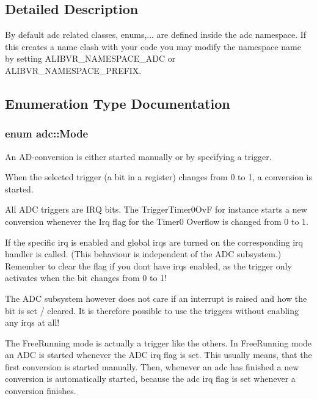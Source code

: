 \subsection{Detailed Description}
By default adc related classes, enums,... are defined inside the {\ttfamily adc} namespace. If this creates a name clash with your code you may modify the namespace name by setting A\+L\+I\+B\+V\+R\+\_\+\+N\+A\+M\+E\+S\+P\+A\+C\+E\+\_\+\+A\+DC or A\+L\+I\+B\+V\+R\+\_\+\+N\+A\+M\+E\+S\+P\+A\+C\+E\+\_\+\+P\+R\+E\+F\+IX. 

\subsection{Enumeration Type Documentation}
\subsubsection[{\texorpdfstring{Mode}{Mode}}]{\setlength{\rightskip}{0pt plus 5cm}enum {\bf adc\+::\+Mode}\hspace{0.3cm}{\ttfamily [strong]}}\hypertarget{namespaceadc_a8094fa55ea1a7729bb35c230163c0f8f}{}\label{namespaceadc_a8094fa55ea1a7729bb35c230163c0f8f}


An A\+D-\/conversion is either started manually or by specifying a trigger. 

When the selected trigger (a bit in a register) changes from 0 to 1, a conversion is started.

All A\+DC triggers are I\+RQ bits. The Trigger\+Timer0\+OvF for instance starts a new conversion whenever the Irq flag for the Timer0 Overflow is changed from 0 to 1.

If the specific irq is enabled and global irqs are turned on the corresponding irq handler is called. (This behaviour is independent of the A\+DC subsystem.) Remember to clear the flag if you don\textquotesingle{}t have irqs enabled, as the trigger only activates when the bit changes from 0 to 1!

The A\+DC subsystem however does not care if an interrupt is raised and how the bit is set / cleared. It is therefore possible to use the triggers without enabling any irqs at all!

The Free\+Running mode is actually a trigger like the others. In Free\+Running mode an A\+DC is started whenever the A\+DC irq flag is set. This usually means, that the first conversion is started manually. Then, whenever an adc has finished a new conversion is automatically started, because the adc irq flag is set whenever a conversion finishes.

